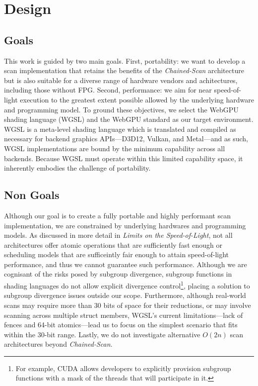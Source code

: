 \documentclass[sigconf]{acmart}
\begin{document}
\section{Design}
\subsection{Goals}
This work is guided by two main goals. First, portability: we want to develop a scan implementation that retains the benefits of the \emph{Chained-Scan} architecture but is also suitable for a diverse range of hardware vendors and achitectures, including those without FPG\@. Second, performance: we aim for near speed-of-light execution to the greatest extent possible allowed by the underlying hardware and programming model. To ground these objectives, we select the WebGPU shading language (WGSL) and the WebGPU standard as our target environment. WGSL is a meta-level shading language which is translated and compiled as necessary for backend graphics APIs---D3D12, Vulkan, and Metal---and as such, WGSL implementations are bound by the minimum capability across all backends. Because WGSL must operate within this limited capability space, it inherently embodies the challenge of portability.

\subsection{Non Goals}
Although our goal is to create a fully portable and highly performant scan implementation, we are constrained by underlying hardwares and programming models. As discussed in more detail in \emph{Limits on the Speed-of-Light}, not all architectures offer atomic operations that are sufficiently fast enough or scheduling models that are sufficeintly fair enough to attain speed-of-light performance, and thus we cannot guarantee such performance. Although we are cognisant of the risks posed by subgroup divergence, subgroup functions in shading languages do not allow explicit divergence control\footnote{For example, CUDA allows developers to explicitly provision subgroup functions with a mask of the threads that will participate in it.}, placing a solution to subgroup divergence issues outside our scope. Furthermore, although real-world scans may require more than 30 bits of space for their reductions, or may involve scanning across multiple struct members, WGSL’s current limitations---lack of fences and 64-bit atomics---lead us to focus on the simplest scenario that fits within the 30-bit range. Lastly, we do not investigate alternative $O(2n)$ scan architectures beyond \emph{Chained-Scan}.
\end{document}
